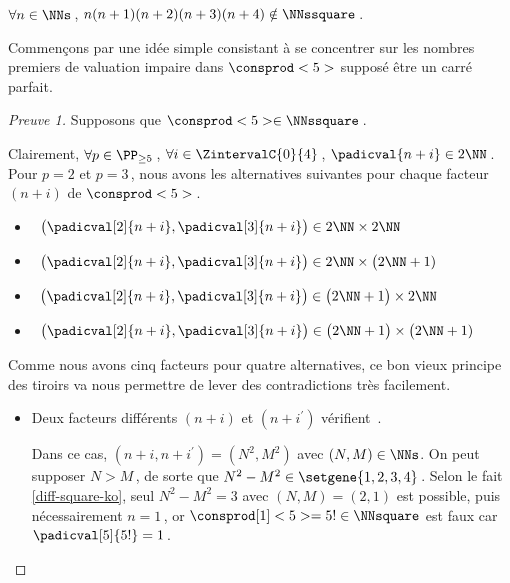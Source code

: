 \begin{fact} \label{case-5}
	 $\forall n \in \NNs$\,, $n(n+1)(n+2)(n+3)(n+4) \notin \NNssquare$\,.
\end{fact}




Commençons par une idée simple consistant à se concentrer sur les nombres premiers de valuation impaire dans $\consprod<5>$ supposé être un carré parfait.


\begin{proof}[Preuve 1]%
    Supposons que $\consprod<5> \in \NNssquare$\,.
    
    \smallskip
    
    Clairement, 
    $\forall p \in \PP_{\geq 5}$\,, 
    $\forall i \in \ZintervalC{0}{4}$\,, 
    $\padicval{n + i} \in 2 \NN$\,.
    Pour $p = 2$ et $p = 3$\,, nous avons les alternatives suivantes pour chaque facteur $(n+i)$ de $\consprod<5>$\,.
    \begin{itemize}
    	\smallskip
		\item {}\,
		$\big( \padicval[2]{n + i} , \padicval[3]{n + i} \big) \in 2 \NN \times 2 \NN$

    	\smallskip
		\item {}\,
		$\big( \padicval[2]{n + i} , \padicval[3]{n + i} \big) \in 2 \NN \times \big( 2 \NN + 1)$

    	\smallskip
		\item {}\,
		$\big( \padicval[2]{n + i} , \padicval[3]{n + i} \big) \in \big( 2 \NN + 1 \big) \times 2 \NN$

    	\smallskip
		\item {}\,
		$\big( \padicval[2]{n + i} , \padicval[3]{n + i} \big) \in \big( 2 \NN + 1 \big) \times \big( 2 \NN + 1)$
    \end{itemize}
    
    \medskip
    
    Comme nous avons cinq facteurs pour quatre alternatives, ce bon vieux principe des tiroirs va nous permettre de lever des contradictions très facilement.
    \begin{itemize}
    	\medskip
		\item Deux facteurs différents $(n+i)$ et $(n+i^\prime)$ vérifient \,.
		
		\smallskip
		\noindent
		Dans ce cas, $(n+i, n+i^\prime) = (N^2, M^2)$ avec $(N, M) \in \NNs$.
		On peut supposer $N > M$\,, de sorte que $N^2 - M^2 \in \setgene{1, 2, 3, 4}$\,. 
		Selon le fait \ref{diff-square-ko}, seul $N^2 - M^2 = 3$ avec $(N, M) = (2, 1)$ est possible, puis nécessairement $n = 1$\,, or $\consprod[1]<5> = 5 ! \in \NNsquare$ est faux car $\padicval[5]{5!} = 1$\,.
		

\end{itemize}
\end{proof}

